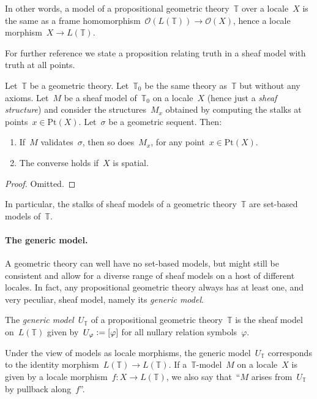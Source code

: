 \documentclass{ws-rv9x6}
\renewcommand{\O}{\mathcal{O}}
\newcommand{\TT}{\mathbb{T}}
\newcommand{\defeq}{\vcentcolon=}
\renewcommand{\_}{\mathpunct{.}}
\newcommand{\?}{\,{:}\,}
\newcommand{\Pt}{\mathrm{Pt}}
\begin{document}
In other words, a model of a propositional geometric theory~$\TT$ over a
locale~$X$ is the same as a frame homomorphism~$\O(L(\TT)) \to \O(X)$, hence a
locale morphism~$X \to L(\TT)$.

For further reference we state a proposition relating truth in a sheaf model
with truth at all points.

\begin{proposition}\label{prop:at-points}
Let~$\TT$ be a geometric theory. Let~$\TT_0$ be the same
theory as~$\TT$ but without any axioms. Let~$M$ be a sheaf model
of~$\TT_0$ on a locale~$X$ (hence just a \emph{sheaf structure}) and consider
the structures~$M_x$ obtained by computing the stalks at points~$x \in \Pt(X)$.
Let~$\sigma$ be a geometric sequent.
Then:
\begin{enumerate}
\item If~$M$ validates~$\sigma$, then so does~$M_x$, for any point~$x \in \Pt(X)$.
\item The converse holds if~$X$ is spatial.
\end{enumerate}
\end{proposition}

\begin{proof}Omitted.\end{proof}

In particular, the stalks of sheaf models of a geometric theory~$\TT$ are
set-based models of~$\TT$.

\paragraph{The generic model.}
A geometric theory can well have no set-based models, but might still be
consistent and allow for a diverse range of sheaf models on a host of different
locales. In fact, any propositional geometric theory always has at least one,
and very peculiar, sheaf model, namely its \emph{generic model}.

\begin{definition}The \emph{generic model}~$U_\TT$ of a propositional geometric
theory~$\TT$ is the sheaf model on~$L(\TT)$ given by~$U_\varphi \defeq
[\varphi]$ for all nullary relation symbols~$\varphi$.\end{definition}

Under the view of models as locale morphisms, the generic model~$U_\TT$
corresponds to the identity morphism~$L(\TT) \to L(\TT)$. If a~$\TT$-model~$M$ on
a locale~$X$ is given by a locale morphism~$f : X \to L(\TT)$, we also say
that~``$M$ arises from~$U_\TT$ by pullback along~$f$''.
\end{document}
